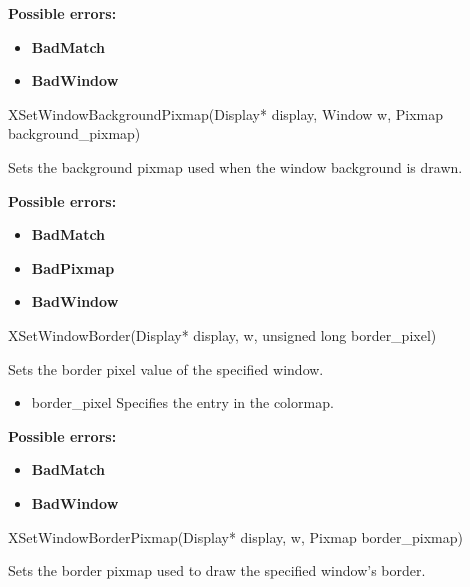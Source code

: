 \documentclass{report}
\begin{document}
\begin{itemize}
            \bigbreak \noindent
            \textbf{Possible errors:}
            \begin{itemize}
                \item \textbf{BadMatch}
                \item \textbf{BadWindow}
            \end{itemize}

            \begin{cppcode}
                XSetWindowBackgroundPixmap(Display* display, Window w, Pixmap background_pixmap)
            \end{cppcode}
            \bigbreak \noindent
            Sets the background pixmap used when the window background is drawn.

            \bigbreak \noindent
            \textbf{Possible errors:}
            \begin{itemize}
                \item \textbf{BadMatch}
                \item \textbf{BadPixmap}
                \item \textbf{BadWindow}
            \end{itemize}

            \begin{cppcode}
                XSetWindowBorder(Display* display, w, unsigned long border_pixel)
            \end{cppcode}
            \bigbreak \noindent
            Sets the border pixel value of the specified window.
            \begin{itemize}
                \item border\_pixel Specifies the entry in the colormap.
            \end{itemize}

            \bigbreak \noindent
            \textbf{Possible errors:}
            \begin{itemize}
                \item \textbf{BadMatch}
                \item \textbf{BadWindow}
            \end{itemize}

            \begin{cppcode}
                XSetWindowBorderPixmap(Display* display, w, Pixmap border_pixmap)
            \end{cppcode}
            \bigbreak \noindent
            Sets the border pixmap used to draw the specified window's border.


\end{itemize}
\end{document}
